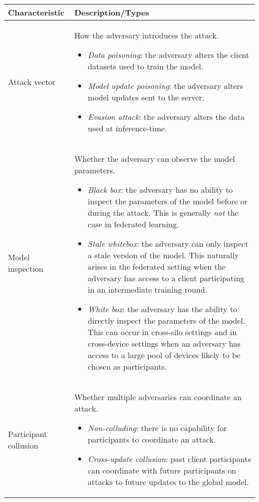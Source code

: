 \begin{table}[ht]
\renewcommand{\arraystretch}{1.75}
\begin{center} 
\begin{tabularx}{\textwidth}{lX}
    \toprule
\textbf{Characteristic} & \textbf{Description/Types}\\
\midrule
\addlinespace[0.05in]

Attack vector & How the adversary introduces the attack.
\begin{itemize}[leftmargin=*]
    \setlength\itemsep{0.05em}
    \item\emph{Data poisoning}: the adversary alters the client datasets used to train the model.
    \item\emph{Model update poisoning}: the adversary alters model updates sent to the server.
    \item\emph{Evasion attack}: the adversary alters the data used at inference-time.
\end{itemize}
\\[-.5em]
\raggedright Model inspection & Whether the adversary can observe the model parameters.
\begin{itemize}[leftmargin=*]
    \setlength\itemsep{0.05em}
    \item \emph{Black box}: the adversary has no ability to inspect the parameters of the model before or during the attack. This is generally \emph{not} the case in federated learning.
    \item \emph{Stale whitebox}: the adversary can only inspect a stale version of the model. This naturally arises in the federated setting when the adversary has access to a client participating in an intermediate training round.
    \item \emph{White box}: the adversary has the ability to directly inspect the parameters of the model. This can occur in cross-silo settings and in cross-device settings when an adversary has access to a large pool of devices likely to be chosen as participants.
\end{itemize}
\\[-.5em]
\raggedright Participant collusion & Whether multiple adversaries can coordinate an attack.
\begin{itemize}[leftmargin=*]
    \setlength\itemsep{0.05em}
    \item \emph{Non-colluding}: there is no capability for participants to coordinate an attack.
    \item \emph{Cross-update collusion}: past client participants can coordinate with future participants on attacks to future updates to the global model.

\end{itemize}
\end{tabularx}
\end{center}
\end{table}
